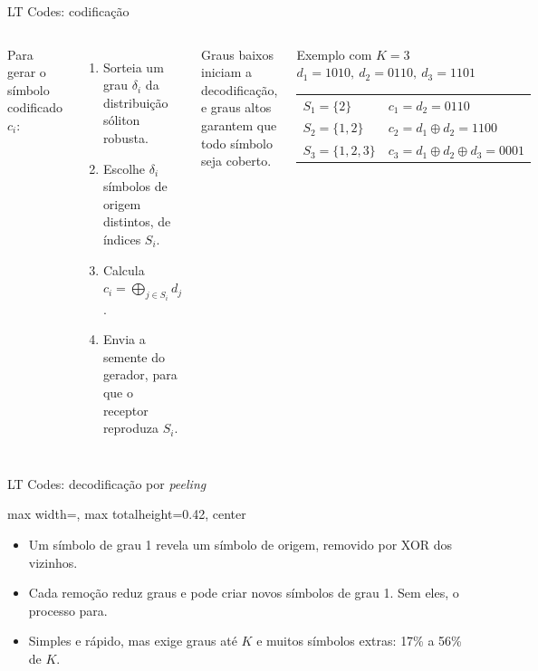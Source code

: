 \documentclass[aspectratio=169,10pt]{beamer}
\newcommand{\figura}[2][0.72]{%
	\begin{adjustbox}{max width=\textwidth, max totalheight=#1\textheight, center}\end{adjustbox}}
\newenvironment{topicos}{\begin{itemize}\setlength{\itemsep}{0.7em}}{\end{itemize}}
\begin{document}
\begin{frame}{LT Codes: codificação}
	\begin{columns}[T, onlytextwidth]
		Para gerar o símbolo codificado $c_i$:
		\begin{enumerate}\setlength{\itemsep}{0.5em}
			\item Sorteia um grau $\delta_i$ da distribuição \alert{sóliton robusta}.
			\item Escolhe $\delta_i$ símbolos de origem distintos, de índices $S_i$.
			\item Calcula $c_i = \bigoplus_{j \in S_i} d_j$.
			\item Envia a semente do gerador, para que o receptor reproduza $S_i$.
		\end{enumerate}
		\vspace{0.5em}
		Graus baixos iniciam a decodificação, e graus altos garantem que todo símbolo seja coberto.
		\begin{block}{Exemplo com $K = 3$}
			\small
			$d_1 = 1010,\ d_2 = 0110,\ d_3 = 1101$
			\par\vspace{0.6em}
			\renewcommand{\arraystretch}{1.25}
			\setlength{\tabcolsep}{3pt}
			\begin{tabular}{@{}ll@{}}
				$S_1 = \{2\}$ & $c_1 = d_2 = 0110$ \\
				$S_2 = \{1, 2\}$ & $c_2 = d_1 \oplus d_2 = 1100$ \\
				$S_3 = \{1, 2, 3\}$ & $c_3 = d_1 \oplus d_2 \oplus d_3 = 0001$ \\
			\end{tabular}
		\end{block}
	\end{columns}
\end{frame}

\begin{frame}{LT Codes: decodificação por \emph{peeling}}
	\figura[0.42]{../thesis/img/tikz/lt_grafo}
	\vfill
	\begin{topicos}
		\item Um símbolo de grau 1 revela um símbolo de origem, removido por XOR dos vizinhos.
		\item Cada remoção reduz graus e pode criar novos símbolos de grau 1. Sem eles, o processo para.
		\item Simples e rápido, mas exige graus até $K$ e muitos símbolos extras: \alert{17\% a 56\%} de $K$.
	\end{topicos}
\end{frame}
\end{document}
